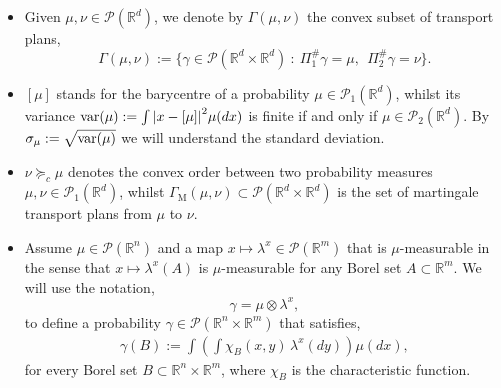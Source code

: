 \documentclass[11pt,reqno]{amsart}
\theoremstyle{definition}
\numberwithin{equation}{section}
\newcommand{\R}{\mathbb{R}}
\newcommand{\Rd}{{\R^d}}
\newcommand{\var}{{\rm{var}}}
\newcommand{\argu}{{\,\cdot\,}}
\newcommand{\PP}{\mathcal{P}}
\newcommand{\pairing}[1]{{\left \langle #1 \right \rangle}}
\newcommand{\abs}[1]{{\left \lvert #1 \right \rvert}}
\begin{document}
\begin{itemize}[leftmargin=1.2\parindent]
 \item Given $\mu, \nu\in \PP(\Rd)$, we denote by $\Gamma(\mu,\nu)$ the convex subset of transport plans,
 $$ \Gamma(\mu,\nu):= \Big\{ \gamma\in \PP(\R^d \times \Rd)\ :\   \Pi_1^\# \gamma=\mu, \ \ \Pi_2^\#\gamma=\nu \Big\}.$$





 \item $[\mu]$ stands for the barycentre of a probability $\mu\in \PP_1(\Rd)$, whilst its variance  $\var(\mu):= \int \abs{x-[\mu]}^2 \mu(dx)$ is finite if and only if $\mu\in\PP_2(\Rd)$. By $\sigma_\mu := \sqrt{\var(\mu)}$ we will understand the standard deviation.



\item $\nu \succeq_c \mu$ denotes the convex order between  two probability measures $\mu,\nu\in \PP_1(\Rd)$, whilst $\Gamma_{\mathrm{M}}(\mu,\nu) \subset \PP(\Rd \times \Rd)$ is the set of martingale transport plans from $\mu$ to $\nu$.

\item Assume $\mu\in \PP(\R^n)$ and a map $x \mapsto \lambda^x \in \PP(\R^m)$ that is $\mu$-measurable in the sense that $x \mapsto \lambda^x(A)$ is $\mu$-measurable for any Borel set $A \subset \R^m$. We will use the notation,
\begin{equation}
	\label{eq:convention} \gamma= \mu \otimes \lambda^x,
\end{equation}
to define a probability $\gamma \in \PP(\R^n \times \R^m)$  that satisfies,
\begin{align*}
	 \gamma(B):= \int  \left(  \int  \chi_{B}(x,y)\,\lambda^x(dy) \right) \mu(dx),
\end{align*}
for every Borel set  $B \subset \R^n \times \R^m$, where $\chi_B$ is the characteristic function.






\end{itemize}
\end{document}
